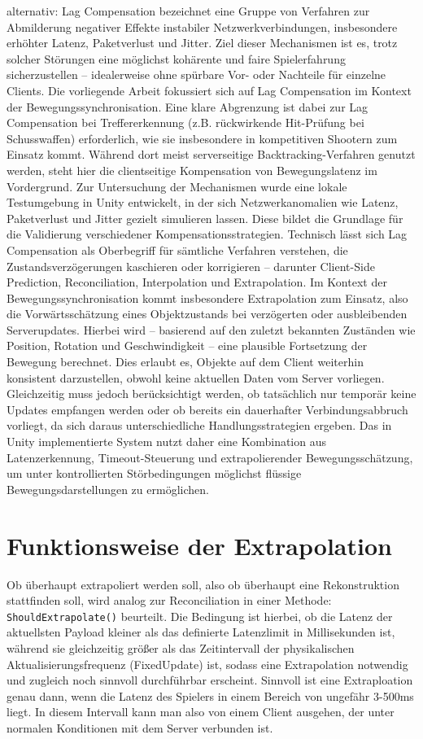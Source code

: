 \begin{enumerate}
alternativ:
Lag Compensation bezeichnet eine Gruppe von Verfahren zur Abmilderung negativer Effekte instabiler Netzwerkverbindungen, insbesondere erhöhter Latenz, Paketverlust und Jitter. Ziel dieser Mechanismen ist es, trotz solcher Störungen eine möglichst kohärente und faire Spielerfahrung sicherzustellen – idealerweise ohne spürbare Vor- oder Nachteile für einzelne Clients.
Die vorliegende Arbeit fokussiert sich auf Lag Compensation im Kontext der Bewegungssynchronisation. Eine klare Abgrenzung ist dabei zur Lag Compensation bei Treffererkennung (z.B. rückwirkende Hit-Prüfung bei Schusswaffen) erforderlich, wie sie insbesondere in kompetitiven Shootern zum Einsatz kommt. Während dort meist serverseitige Backtracking-Verfahren genutzt werden, steht hier die clientseitige Kompensation von Bewegungslatenz im Vordergrund.
Zur Untersuchung der Mechanismen wurde eine lokale Testumgebung in Unity entwickelt, in der sich Netzwerkanomalien wie Latenz, Paketverlust und Jitter gezielt simulieren lassen. Diese bildet die Grundlage für die Validierung verschiedener Kompensationsstrategien.
Technisch lässt sich Lag Compensation als Oberbegriff für sämtliche Verfahren verstehen, die Zustandsverzögerungen kaschieren oder korrigieren – darunter Client-Side Prediction, Reconciliation, Interpolation und Extrapolation. Im Kontext der Bewegungssynchronisation kommt insbesondere Extrapolation zum Einsatz, also die Vorwärtsschätzung eines Objektzustands bei verzögerten oder ausbleibenden Serverupdates.
Hierbei wird – basierend auf den zuletzt bekannten Zuständen wie Position, Rotation und Geschwindigkeit – eine plausible Fortsetzung der Bewegung berechnet. Dies erlaubt es, Objekte auf dem Client weiterhin konsistent darzustellen, obwohl keine aktuellen Daten vom Server vorliegen. Gleichzeitig muss jedoch berücksichtigt werden, ob tatsächlich nur temporär keine Updates empfangen werden oder ob bereits ein dauerhafter Verbindungsabbruch vorliegt, da sich daraus unterschiedliche Handlungsstrategien ergeben.
Das in Unity implementierte System nutzt daher eine Kombination aus Latenzerkennung, Timeout-Steuerung und extrapolierender Bewegungsschätzung, um unter kontrollierten Störbedingungen möglichst flüssige Bewegungsdarstellungen zu ermöglichen.

\section{Funktionsweise der Extrapolation}
Ob überhaupt extrapoliert werden soll, also ob überhaupt eine Rekonstruktion stattfinden soll, wird analog zur Reconciliation in einer Methode: \texttt{ShouldExtrapolate()} beurteilt.
Die Bedingung ist hierbei, ob die Latenz der aktuellsten Payload kleiner als das definierte Latenzlimit in Millisekunden ist, während sie gleichzeitig größer als das Zeitintervall der physikalischen Aktualisierungsfrequenz (FixedUpdate) ist, sodass eine Extrapolation notwendig und zugleich noch sinnvoll durchführbar erscheint. Sinnvoll ist eine Extraploation genau dann, wenn die Latenz des Spielers in einem Bereich von ungefähr 3-500ms liegt. In diesem Intervall kann man also von einem Client ausgehen, der unter normalen Konditionen mit dem Server verbunden ist.


\end{enumerate}
